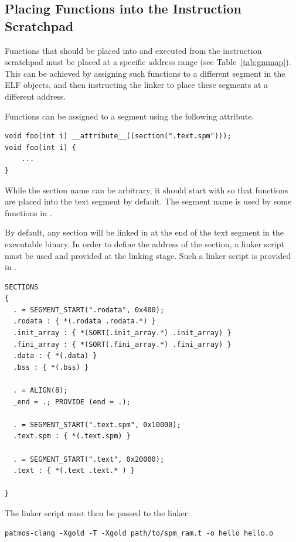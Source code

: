 \subsection{Placing Functions into the Instruction Scratchpad}

Functions that should be placed into and executed from the instruction scratchpad must be placed at
a specific address range (see Table~\ref{tab:gmmap}). This can be achieved by assigning such functions
to a different segment in the ELF objects, and then instructing the linker to place these segments at
a different address.


Functions can be assigned to a segment using the following attribute.

\begin{verbatim}
void foo(int i) __attribute__((section(".text.spm")));
void foo(int i) {
    ...
}
\end{verbatim}

While the section name can be arbitrary, it should start with  so that functions are placed
into the text segment by default. The  segment name is used by some functions in 
.

By default, any  section will be linked in at the end of the text segment in the executable binary.
In order to define the address of the section, a linker script must be used and provided at the linking stage.
Such a linker script is provided in .

\begin{verbatim}
SECTIONS
{
  . = SEGMENT_START(".rodata", 0x400);
  .rodata : { *(.rodata .rodata.*) }
  .init_array : { *(SORT(.init_array.*) .init_array) }
  .fini_array : { *(SORT(.fini_array.*) .fini_array) }
  .data : { *(.data) }
  .bss : { *(.bss) }

  . = ALIGN(8);
  _end = .; PROVIDE (end = .);

  . = SEGMENT_START(".text.spm", 0x10000);
  .text.spm : { *(.text.spm) }

  . = SEGMENT_START(".text", 0x20000);
  .text : { *(.text .text.* ) }

}
\end{verbatim}

The linker script must then be passed to the linker.

\begin{verbatim}
patmos-clang -Xgold -T -Xgold path/to/spm_ram.t -o hello hello.o
\end{verbatim}

